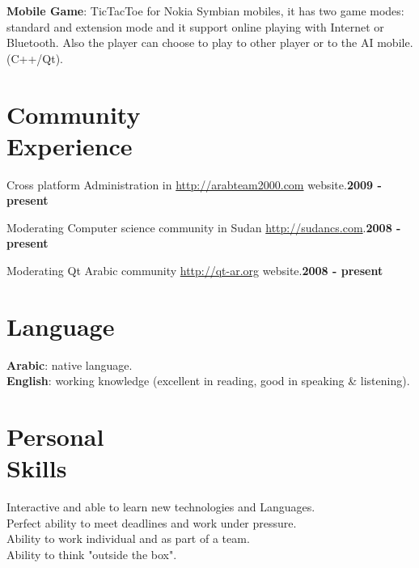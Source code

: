 \documentclass[margin,line]{resume}
\begin{document}
\begin{resume}
\textbf{Mobile Game}: TicTacToe for Nokia Symbian mobiles, it has two game modes: standard and extension mode and it support online playing with Internet or Bluetooth. Also the player can choose to play to other player or to the AI mobile.(C++/Qt).\\
\vspace{-2mm}




\section{\mysidestyle  Community\\Experience} 
Cross platform Administration in \url{http://arabteam2000.com} website.\hfill \textbf{2009 - present}\vspace{-2mm}

Moderating Computer science community in Sudan \url{http://sudancs.com}.\hfill \textbf{2008 - present}\vspace{-2mm}

Moderating Qt Arabic community \url{http://qt-ar.org} website.\hfill \textbf{2008 - present}\vspace{-3mm}\\\vspace{3mm}

\section{\mysidestyle Language}
	\textbf{Arabic}:   native language.\\
	\textbf{English}: working knowledge (excellent in reading, good in speaking \& listening).\\

\section{\mysidestyle Personal\\Skills}
	Interactive and able to learn new technologies and Languages.\\
	Perfect ability to meet deadlines and work under pressure.\\
	Ability to work individual and as part of a team.\\
	Ability to think "outside the box".


\end{resume}
\end{document}
